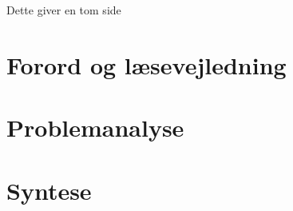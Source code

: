 
\raggedbottom



\frontmatter


\clearpage
\thispagestyle{empty}
{\color{white}Dette giver en tom side}
\clearpage


\chapter*{Forord og læsevejledning}\vspace{-.75cm}

\newpage

\tableofcontents* 

\mainmatter


\chapter{Problemanalyse}\vspace{-.75cm}

\cleardoublepage
\chapter{Syntese}\vspace{-.75cm}
%

\begingroup
\label{litteraturliste}
\raggedright


\endgroup
\begin{appendices}
%	
%	
\end{appendices}


